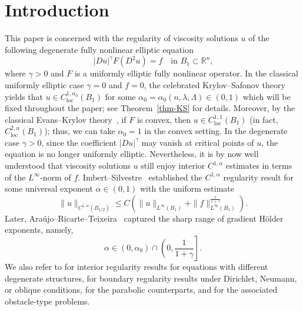 \documentclass[11pt]{amsart}
\theoremstyle{plain}
\theoremstyle{definition}
\numberwithin{equation}{section}
\begin{document}
\section{Introduction}
This paper is concerned with the regularity of viscosity solutions $u$ of the following degenerate fully nonlinear elliptic equation
\begin{equation*}
    |Du|^{\gamma}F(D^2u)=f \quad \text{in $B_1 \subset \mathbb{R}^n$,}
\end{equation*}
where $\gamma > 0$ and $F$ is a uniformly elliptic fully nonlinear operator. In the classical uniformly elliptic case $\gamma=0$ and $f=0$, the celebrated Krylov--Safonov theory~\cite{KS79, KS80} yields that $u \in C^{1, \alpha_0}_{\mathrm{loc}}(B_1)$ for some  $\alpha_0=\alpha_0(n, \lambda,\Lambda) \in (0,1)$ which will be fixed throughout the paper; see Theorem~\ref{thm-KS} for details.
Moreover, by the classical Evans--Krylov theory~\cite{Eva82, Kry82, Kry83}, if $F$ is convex, then $u \in C^{1,1}_{\mathrm{loc}}(B_1)$ (in fact, $C^{2,\alpha}_{\mathrm{loc}}(B_1)$); thus, we can take $\alpha_0=1$ in the convex setting.
In the degenerate case $\gamma>0$, since the coefficient $|Du|^{\gamma}$ may vanish at critical points of $u$, the equation is no longer uniformly elliptic. Nevertheless, it is by now well understood that viscosity solutions $u$ still enjoy interior $C^{1, \alpha}$ estimates in terms of the $L^{\infty}$-norm of $f$. Imbert--Silvestre~\cite{IS13} established the $C^{1, \alpha}$ regularity result for some universal exponent $\alpha \in (0,1)$ with the uniform estimate
\begin{equation*}
    \|u\|_{C^{1,\alpha}(\overline{B_{1/2}})}\leq C(\|u\|_{L^{\infty}(B_1)}+\|f\|_{L^{\infty}(B_1)}^{\frac{1}{1+\gamma}}).
\end{equation*}
Later, Ara\'ujo--Ricarte--Teixeira~\cite{ART15} captured the sharp range of gradient H\"older exponents, namely,
\begin{equation*}
    \alpha \in (0, \alpha_0) \cap \left(0, \frac{1}{1+\gamma}\right].
\end{equation*}
 We also refer to \cite{APPT22, BBLL24int, BKO25, BPRT20, DF21, FVZ21, Nas25, dSR20} for interior regularity results for equations with different degenerate structures, \cite{AS23, BBLL24, BD14, BKO252, BV21} for boundary regularity results under Dirichlet, Neumann, or oblique conditions, \cite{AJ25, LLY24, LLYZ25} for the parabolic counterparts, and \cite{ART17, HPRS24, dSV21, dSV21b} for the associated obstacle-type problems.\newline
\end{document}
